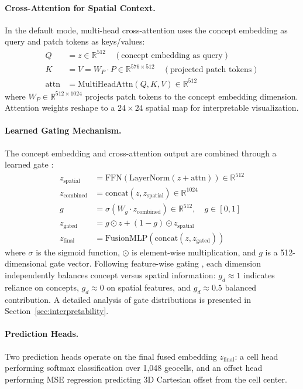 \documentclass{uva-inf-article}
\begin{document}
\paragraph{Cross-Attention for Spatial Context.}
In the default mode, multi-head cross-attention \parencite{vaswani2017attention} uses the concept embedding as query and patch tokens as keys/values:
\begin{align}
Q &= z \in \mathbb{R}^{512} \quad (\text{concept embedding as query}) \\
K &= V = W_P \cdot P \in \mathbb{R}^{576 \times 512} \quad (\text{projected patch tokens}) \\
\text{attn} &= \text{MultiHeadAttn}(Q, K, V) \in \mathbb{R}^{512}
\end{align}
where $W_P \in \mathbb{R}^{512 \times 1024}$ projects patch tokens to the concept embedding dimension. Attention weights reshape to a $24 \times 24$ spatial map for interpretable visualization.

\paragraph{Learned Gating Mechanism.}
The concept embedding and cross-attention output are combined through a learned gate \parencite{srivastava2015highway, arevalo2017gated}:
\begin{align}
z_{\text{spatial}} &= \text{FFN}(\text{LayerNorm}(z + \text{attn})) \in \mathbb{R}^{512} \\
z_{\text{combined}} &= \text{concat}(z, z_{\text{spatial}}) \in \mathbb{R}^{1024} \\
g &= \sigma(W_g \cdot z_{\text{combined}}) \in \mathbb{R}^{512}, \quad g \in [0, 1] \\
z_{\text{gated}} &= g \odot z + (1 - g) \odot z_{\text{spatial}} \\
z_{\text{final}} &= \text{FusionMLP}(\text{concat}(z, z_{\text{gated}}))
\end{align}
where $\sigma$ is the sigmoid function, $\odot$ is element-wise multiplication, and $g$ is a 512-dimensional gate vector. Following feature-wise gating \parencite{perez2018film}, each dimension independently balances concept versus spatial information: $g_d \approx 1$ indicates reliance on concepts, $g_d \approx 0$ on spatial features, and $g_d \approx 0.5$ balanced contribution. A detailed analysis of gate distributions is presented in Section~\ref{sec:interpretability}.

\paragraph{Prediction Heads.}
Two prediction heads operate on the final fused embedding $z_{\text{final}}$: a cell head performing softmax classification over 1,048 geocells, and an offset head performing MSE regression predicting 3D Cartesian offset from the cell center.
\end{document}
